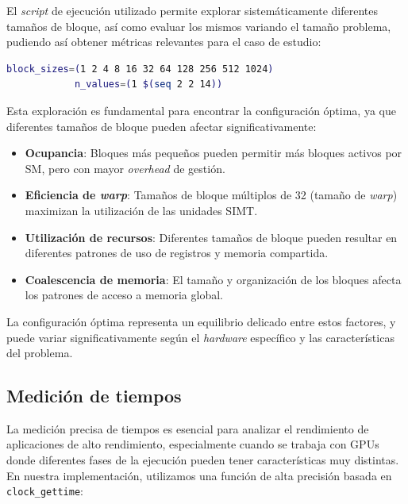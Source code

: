         El \textit{script} de ejecución utilizado permite explorar sistemáticamente diferentes tamaños de bloque, así como evaluar los mismos variando el tamaño problema, pudiendo así obtener métricas relevantes para el caso de estudio:
        
        \begin{lstlisting}[language=bash, caption={Bloques y tamaño de problema evaluado.}, gobble=12]
            block_sizes=(1 2 4 8 16 32 64 128 256 512 1024)
            n_values=(1 $(seq 2 2 14))
        \end{lstlisting}
    
        Esta exploración es fundamental para encontrar la configuración óptima, ya que diferentes tamaños de bloque pueden afectar significativamente:
        
        \begin{itemize}
        
            \item \textbf{Ocupancia}: Bloques más pequeños pueden permitir más bloques activos por SM, pero con mayor \textit{overhead} de gestión.
            
            \item \textbf{Eficiencia de \textit{warp}}: Tamaños de bloque múltiplos de 32 (tamaño de \textit{warp}) maximizan la utilización de las unidades SIMT.
            
            \item \textbf{Utilización de recursos}: Diferentes tamaños de bloque pueden resultar en diferentes patrones de uso de registros y memoria compartida.
            
            \item \textbf{Coalescencia de memoria}: El tamaño y organización de los bloques afecta los patrones de acceso a memoria global.
            
        \end{itemize}
        
        La configuración óptima representa un equilibrio delicado entre estos factores, y puede variar significativamente según el \textit{hardware} específico y las características del problema.

    \subsection{Medición de tiempos}

        La medición precisa de tiempos es esencial para analizar el rendimiento de aplicaciones de alto rendimiento, especialmente cuando se trabaja con GPUs donde diferentes fases de la ejecución pueden tener características muy distintas. En nuestra implementación, utilizamos una función de alta precisión basada en \texttt{clock\_gettime}:

